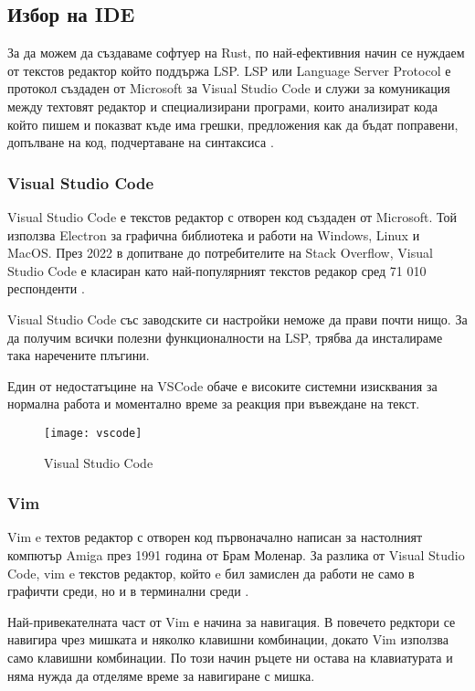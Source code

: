 \subsection{Избор на IDE}
За да можем да създаваме софтуер на Rust, по най-ефективния начин се нуждаем от
текстов редактор който поддържа LSP. LSP или Language Server Protocol е
протокол създаден от Microsoft за Visual Studio Code и служи за комуникация
между техтовят редактор и специализирани програми, които анализират кода който
пишем и показват къде има грешки, предложения как да бъдат поправени, допълване
на код, подчертаване на синтаксиса \cite{lsp_wikipedia}.

\subsubsection{Visual Studio Code}
Visual Studio Code е текстов редактор с отворен код създаден от Microsoft. Той
използва Electron за графична библиотека и работи на Windows, Linux и MacOS. 
През 2022 в допитване до потребителите на Stack Overflow, Visual Studio Code е
класиран като най-популярният текстов редакор сред 71 010 респонденти
\cite{vscode_wikipedia}.

Visual Studio Code със заводските си настройки неможе да прави почти нищо. За
да получим всички полезни функционалности на LSP, трябва да инсталираме така
наречените плъгини.

Един от недостатъцине на VSCode обаче е високите системни изисквания за
нормална работа и моментално време за реакция при въвеждане на текст.
\begin{figure}[!htb]
  \texttt{[image: vscode]}
  \centering
  \caption{Visual Studio Code}
  \label{fig:vscode}
\end{figure}

\subsubsection{Vim}
Vim e техтов редактор с отворен код първоначално написан за настолният компютър
Amiga\cite{amiga_wikipedia} през 1991 година от Брам Моленар. За разлика от
Visual Studio Code, vim e текстов редактор, който e бил замислен да работи не
само в графичти среди, но и в терминални среди \cite{vim_wikipedia}. 

Най-привекателната част от Vim е начина за навигация. В повечето редктори се
навигира чрез мишката и няколко клавишни комбинации, докато Vim използва само
клавишни комбинации. По този начин ръцете ни остава на клавиатурата и няма
нужда да отделяме време за навигиране с мишка. 

